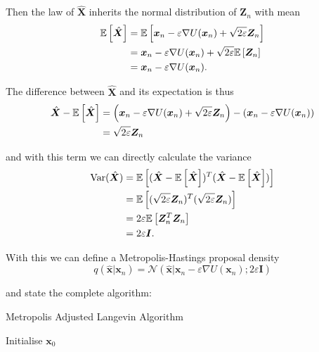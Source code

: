 Then the law of $\hat{\bm{X}}$ inherits the normal distribution of $\bm{Z}_n$ with mean
\[
\begin{aligned}
	\mathbb{E}\left[  \hat{\bm{X}}  \right] 
	&= \mathbb{E}\left[  \bm{x}_n - \varepsilon \nabla U( \bm{x}_n ) + \sqrt{2 \varepsilon} \bm{Z}_n  \right] \\
	&= \bm{x}_n - \varepsilon \nabla U( \bm{x}_n ) + \sqrt{2 \varepsilon} \mathbb{E}\left[  \bm{Z}_n  \right] \\
	&= \bm{x}_n - \varepsilon \nabla U( \bm{x}_n ) . \\
\end{aligned}
\]

The difference between $\hat{\bm{X}}$ and its expectation is thus
\[
\begin{aligned}
	\hat{\bm{X}} - \mathbb{E}\left[  \hat{\bm{X}}  \right] 
	&= \left(\bm{x}_n - \varepsilon \nabla U( \bm{x}_n ) + \sqrt{2 \varepsilon} \bm{Z}_n \right) - \left(\bm{x}_n - \varepsilon \nabla U( \bm{x}_n ) \right) \\
	&= \sqrt{2 \varepsilon} \bm{Z}_n \\
\end{aligned}
\]

and with this term we can directly calculate the variance
\[
\begin{aligned}
	\text{Var}(\hat{\bm{X}}) &= \mathbb{E}\left[  ( \hat{\bm{X}} - \mathbb{E}\left[  \hat{\bm{X}}  \right] )^T ( \hat{\bm{X}} - \mathbb{E}\left[  \hat{\bm{X}}  \right] )  \right] \\
	&= \mathbb{E}\left[  (\sqrt{2\varepsilon} \bm{Z}_n)^T (\sqrt{2 \varepsilon} \bm{Z}_n)  \right] \\
	&= 2 \varepsilon \mathbb{E}\left[  \bm{Z}_n^T \bm{Z}_n  \right] \\
	&= 2 \varepsilon \bm{I}. \\
\end{aligned}
\]

With this we can define a Metropolis-Hastings proposal density
\[
	q(\hat{\bm{x}} | \bm{x}_n) = \mathcal{N}( \hat{\bm{x}} | \bm{x}_n - \varepsilon \nabla U( \bm{x}_n ) ; 2 \varepsilon \bm{I} )
\]

and state the complete algorithm:

\NoCaptionOfAlgo
\begin{algorithm}[H]
\SetAlgoLined
\DontPrintSemicolon
{}
\SetAlCapSkip{1em}
\SetAlCapNameFnt{\normalfont\normalsize}
\caption{Metropolis Adjusted Langevin Algorithm}

Initialise $\bm{x}_0$ \;

\end{algorithm}


